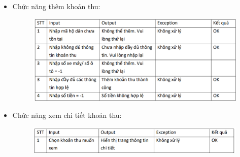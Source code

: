 \documentclass{article}
\begin{document}
\begin{itemize}
\begin{figure}[H]
    \end{figure}
    \item Chức năng thêm khoản thu:
    \begin{figure}[H]
        \centering
        \includegraphics[width=1\textwidth]{Kiểm thử/KT thêm phsi gửi xe.png}
    \end{figure}
    \item Chức năng xem chi tiết khoản thu:
    \begin{figure}[H]
        \centering
        \includegraphics[width=1\textwidth]{Kiểm thử/KT chi tiết khoản thu.png}
    \end{figure}    
\end{itemize}
\newpage
\end{document}
